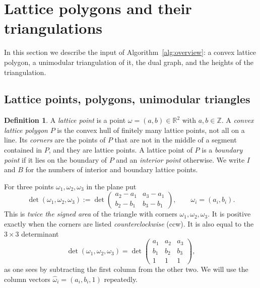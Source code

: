 \documentclass[11pt]{article}
\theoremstyle{plain}
\theoremstyle{definition}
\newtheorem{definition}[theorem]{Definition}
\theoremstyle{remark}
\newcommand{\Z}{\mathbb{Z}}
\newcommand{\R}{\mathbb{R}}
\newcommand{\hatw}{\widehat{\omega}}
\begin{document}
\section{Lattice polygons and their triangulations}\label{sec:polygons}

In this section we describe the input of Algorithm~\ref{alg:overview}: a convex lattice polygon,
a unimodular triangulation of it, the dual graph, and the heights of the triangulation.


\subsection{Lattice points, polygons, unimodular triangles}

\begin{definition}
A \textit{lattice point} is a point $\omega=(a,b)\in\R^2$ with $a,b\in\Z$. A \textit{convex lattice
polygon} $P$ is the convex hull of finitely many lattice points, not all on a line. Its
\textit{corners} are the points of $P$ that are not in the middle of a segment contained in $P$,
and they are lattice points. A lattice point of $P$ is a \textit{boundary point} if it lies on the
boundary of $P$ and an \textit{interior point} otherwise. We write $I$ and $B$ for the numbers of
interior and boundary lattice points.
\end{definition}

For three points $\omega_1,\omega_2,\omega_3$ in the plane put
\begin{equation}\label{eq:det}
\det(\omega_1,\omega_2,\omega_3):=\det\begin{pmatrix}a_2-a_1 & a_3-a_1\\ b_2-b_1& b_3-b_1\end{pmatrix},
\qquad \omega_i=(a_i,b_i).
\end{equation}
This is \textit{twice the signed area} of the triangle with corners
$\omega_1,\omega_2,\omega_3$. It is positive exactly when the corners are listed
\textit{counterclockwise} (ccw). It is also equal to the $3\times 3$ determinant
\begin{equation}\label{eq:det3}
\det(\omega_1,\omega_2,\omega_3)=\det\begin{pmatrix}a_1&a_2&a_3\\ b_1&b_2&b_3\\ 1&1&1\end{pmatrix},
\end{equation}
as one sees by subtracting the first column from the other two. We will use the column vectors
$\hatw_i=(a_i,b_i,1)$ repeatedly.
\end{document}
